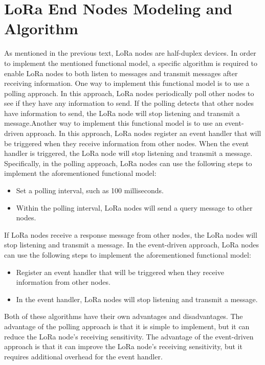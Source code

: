 \section{LoRa End Nodes Modeling and Algorithm}
As mentioned in the previous text, LoRa nodes are half-duplex devices. In order to implement the mentioned functional model, a specific algorithm is required to enable LoRa nodes to both listen to messages and transmit messages after receiving information.
One way to implement this functional model is to use a polling approach. In this approach, LoRa nodes periodically poll other nodes to see if they have any information to send. If the polling detects that other nodes have information to send, the LoRa node will stop listening and transmit a message.Another way to implement this functional model is to use an event-driven approach. In this approach, LoRa nodes register an event handler that will be triggered when they receive information from other nodes. When the event handler is triggered, the LoRa node will stop listening and transmit a message.
Specifically, in the polling approach, LoRa nodes can use the following steps to implement the aforementioned functional model:
\begin{itemize}
  \item Set a polling interval, such as 100 milliseconds.
  \item Within the polling interval, LoRa nodes will send a query message to other nodes.
\end{itemize}
If LoRa nodes receive a response message from other nodes, the LoRa nodes will stop listening and transmit a message.
In the event-driven approach, LoRa nodes can use the following steps to implement the aforementioned functional model:
\begin{itemize}
  \item Register an event handler that will be triggered when they receive information from other nodes.
  \item In the event handler, LoRa nodes will stop listening and transmit a message.
\end{itemize}
Both of these algorithms have their own advantages and disadvantages. The advantage of the polling approach is that it is simple to implement, but it can reduce the LoRa node's receiving sensitivity. The advantage of the event-driven approach is that it can improve the LoRa node's receiving sensitivity, but it requires additional overhead for the event handler.
